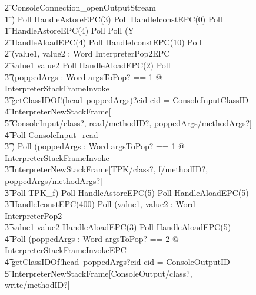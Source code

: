 \begin{figure}[t!]
{\begin{circus}
    \t2 ConsoleConnection\_openOutputStream \\
    \t1 \circfi) \circseq Poll \circseq HandleAstoreEPC(3) \circseq Poll \circseq HandleIconstEPC(0) \circseq Poll \circseq \\
    \t1 HandleAstoreEPC(4) \circseq Poll \circseq Poll \circseq (\circmu Y \circspot \\
    \t2 HandleAloadEPC(4) \circseq Poll \circseq HandleIconstEPC(10) \circseq Poll \circseq \\
    \t2 (\circvar value1, value2 : Word \circspot InterpreterPop2EPC \\
    \t2 \circif value1 \leq value2 \circthen Poll \circseq HandleAloadEPC(2) \circseq Poll \circseq \\
    \t3 (\circvar poppedArgs : \seq Word \circspot \lschexpract \exists argsToPop?  == 1 @ InterpreterStackFrameInvoke \rschexpract \circseq \\
    \t3 getClassIDOf!(head~poppedArgs)?cid \then \circif cid = ConsoleInputClassID \circthen {} \\
    \t4 \lschexpract InterpreterNewStackFrame[ \\
    \t5 ConsoleInput/class?, read/methodID?, poppedArgs/methodArgs?] \rschexpract \circseq \\
    \t4 Poll \circseq ConsoleInput\_read \\
    \t3 \circfi) \circseq Poll \circseq (\circvar poppedArgs : \seq Word \circspot \lschexpract \exists argsToPop? == 1 @ InterpreterStackFrameInvoke \rschexpract \circseq \\
    \t3 \lschexpract InterpreterNewStackFrame[TPK/class?, f/methodID?, poppedArgs/methodArgs?] \rschexpract \circseq \\
    \t3 Poll \circseq TPK\_f) \circseq Poll \circseq HandleAstoreEPC(5) \circseq Poll \circseq HandleAloadEPC(5) \circseq \\
    \t3 HandleIconstEPC(400) \circseq Poll \circseq (\circvar value1, value2 : Word \circspot InterpreterPop2 \circseq \\
    \t3 \circif value1 \leq value2 \circthen HandleAloadEPC(3) \circseq Poll \circseq HandleAloadEPC(5) \circseq \\
    \t4 Poll \circseq (\circvar poppedArgs : Word \circspot \lschexpract \exists argsToPop? == 2 @ InterpreterStackFrameInvokeEPC \rschexpract \circseq \\
    \t4 getClassIDOf!head~poppedArgs?cid \then \circif cid = ConsoleOutputID \circthen {} \\
    \t5 \lschexpract InterpreterNewStackFrame[ConsoleOutput/class?, write/methodID?] \rschexpract \circseq \\

\end{circus}}
\end{figure}
